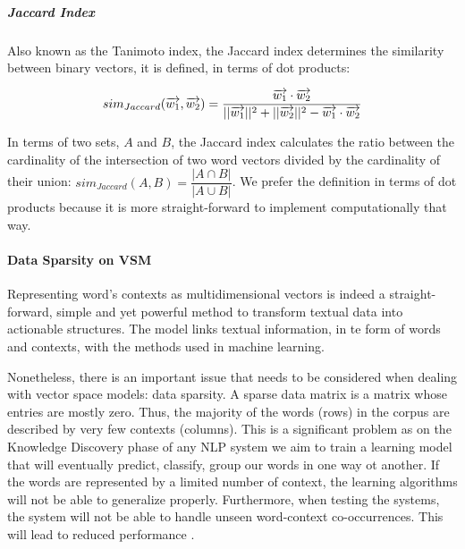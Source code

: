 \subparagraph{Jaccard Index}
Also known as the Tanimoto index, the Jaccard index \cite{jaccard1908nouvelles} determines the similarity between binary vectors, it is defined, in terms of dot products:

\begin{equation}
sim_{Jaccard}(\overrightarrow{w_1},\overrightarrow{w_2}) = \dfrac{\overrightarrow{w_1} \cdot \overrightarrow{w_2}}{||\overrightarrow{w_1}||^2+||\overrightarrow{w_2}||^2 - \overrightarrow{w_1}\cdot\overrightarrow{w_2}}
\vspace{1cm}
\end{equation}

In terms of two sets, $A$ and $B$, the Jaccard index  calculates the ratio between the cardinality of the intersection of two word vectors divided by the cardinality of their union: $sim_{	Jaccard}(A,B)=\dfrac{|A \cap B|}{|A \cup B|}$. We prefer the definition in terms of dot products because it is more straight-forward to implement computationally that way.


\paragraph{Data Sparsity on VSM}

Representing word's contexts as multidimensional  vectors is indeed a straight-forward, simple and  yet powerful method to transform textual data into actionable structures. The model links  textual information, in te form of words and contexts, with the methods used in machine learning.

Nonetheless, there is an important issue that needs to be considered when dealing with vector space models: data sparsity.  A sparse data matrix is a matrix whose entries are mostly zero. Thus, the majority of the words (rows) in the corpus are described by very few contexts (columns). This is a significant problem as on the Knowledge Discovery phase of any NLP system we aim to train a learning model that will eventually predict, classify, group our words in one way ot another. If the words are represented by a limited number of context, the learning algorithms will not be able to generalize properly. Furthermore, when testing the systems, the system will not be able to handle unseen word-context co-occurrences. This will lead to reduced performance \cite{phan2008learning}.

